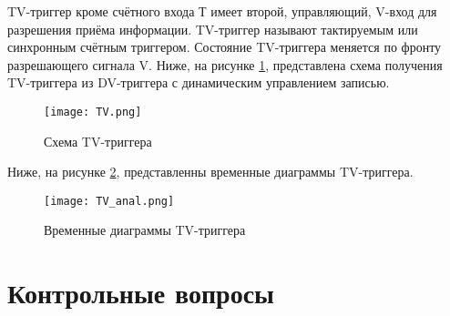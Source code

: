 TV-триггер кроме счётного входа Т имеет второй, управляющий, V-вход для разрешения приёма информации. TV-триггер называют тактируемым или синхронным счётным триггером. Состояние TV-триггера меняется по фронту разрешающего сигнала V. Ниже, на рисунке \ref{tv}, представлена схема получения TV-триггера из DV-триггера с динамическим управлением записью.

\begin{figure}
	\centering
	\texttt{[image: TV.png]}
	\caption{Схема TV-триггера}
	\label{tv}
\end{figure}

Ниже, на рисунке \ref{tv-diag}, представленны временные диаграммы TV-триггера.

\begin{figure}
	\centering
	\texttt{[image: TV\_anal.png]}
	\caption{Временные диаграммы TV-триггера}
	\label{tv-diag}
\end{figure}

\pagebreak

\chapter{Контрольные вопросы}

